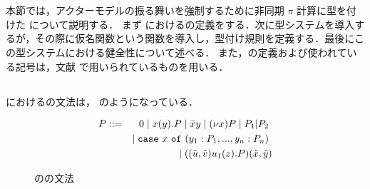 \section{\api}

本節では，アクターモデルの振る舞いを強制するために非同期 $\pi$ 計算に型を付けた \api について説明する．
まず \api における\conf の定義をする．次に型システムを導入するが，その際に仮名関数という関数を導入し，型付け規則を定義する．最後にこの型システムにおける健全性について述べる．
また，\api の定義および使われている記号は，文献\cite[Dean2008]{Agha:2004aa} で用いられているものを用いる．









\subsection{\conf}

\api における\conf の文法は， のようになっている．

\begin{figure}[h]
  \begin{eqnarray}
    P & ::= & \nilconf \mid \actorconf{x}{y}{P} \mid \sendconf{x}{y} \mid \restrictconf{x}{P} \mid \composeconf{P_1}{P_2} \ \nonumber \\
    & & \mid \caseconf{x}{y_1 : P_1 ,..., y_n : P_n} \ \nonumber \\
    & & \mid \instantiate{\tilde{u}}{\tilde{v}}{u_1}{z}{P}{\tilde{x}}{\tilde{y}} \nonumber
  \end{eqnarray}
  \caption{\api の\conf の文法}
  \label{api_config}
\end{figure}

